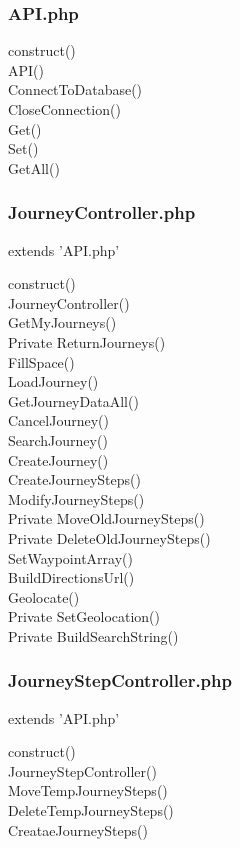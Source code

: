 \documentclass[11pt]{article}
\begin{document}
\subsubsection{API.php}
\begin{description}
\item[\textunderscore \textunderscore construct()]
\item[API()]
\item[ConnectToDatabase()]
\item[CloseConnection()]
\item[Get()]
\item[Set()]
\item[GetAll()]
\end{description}

\subsubsection{Journey\textunderscore Controller.php} 
extends 'API.php'
\begin{description}
\item[\textunderscore \textunderscore construct()]
\item[Journey\textunderscore Controller()]
\item[GetMyJourneys()]
\item[Private ReturnJourneys()]
\item[FillSpace()]
\item[LoadJourney()]
\item[GetJourneyDataAll()]
\item[CancelJourney()]
\item[SearchJourney()]
\item[CreateJourney()]
\item[CreateJourneySteps()]
\item[ModifyJourneySteps()]
\item[Private MoveOldJourneySteps()]
\item[Private DeleteOldJourneySteps()]
\item[SetWaypointArray()]
\item[BuildDirectionsUrl()]
\item[Geolocate()]
\item[Private SetGeolocation()]
\item[Private BuildSearchString()]
\end{description}

\subsubsection{Journey\textunderscore Step\textunderscore Controller.php}
extends 'API.php'
\begin{description}
\item[\textunderscore \textunderscore construct()]
\item[Journey\textunderscore Step\textunderscore Controller()]
\item[MoveTempJourneySteps()]
\item[DeleteTempJourneySteps()]
\item[CreataeJourneySteps()]
\end{description}
\end{document}
